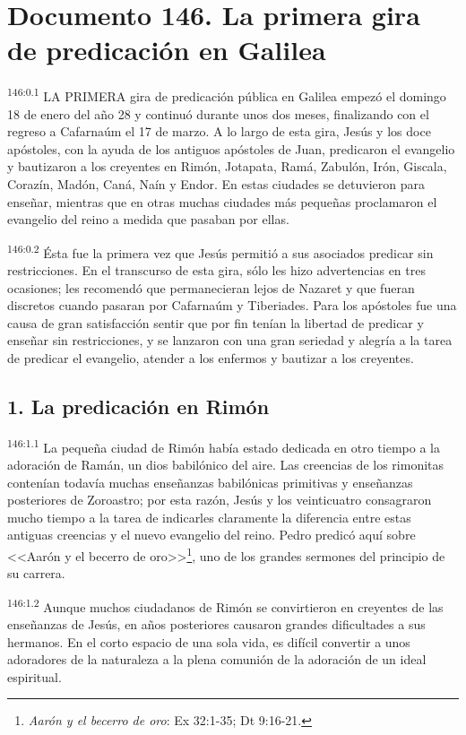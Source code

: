 \chapter{Documento 146. La primera gira de predicación en Galilea}
\par 
\textsuperscript{146:0.1} LA PRIMERA gira de predicación pública en Galilea empezó el domingo 18 de enero del año 28 y continuó durante unos dos meses, finalizando con el regreso a Cafarnaúm el 17 de marzo. A lo largo de esta gira, Jesús y los doce apóstoles, con la ayuda de los antiguos apóstoles de Juan, predicaron el evangelio y bautizaron a los creyentes en Rimón, Jotapata, Ramá, Zabulón, Irón, Giscala, Corazín, Madón, Caná, Naín y Endor. En estas ciudades se detuvieron para enseñar, mientras que en otras muchas ciudades más pequeñas proclamaron el evangelio del reino a medida que pasaban por ellas.

\par 
\textsuperscript{146:0.2} Ésta fue la primera vez que Jesús permitió a sus asociados predicar sin restricciones. En el transcurso de esta gira, sólo les hizo advertencias en tres ocasiones; les recomendó que permanecieran lejos de Nazaret y que fueran discretos cuando pasaran por Cafarnaúm y Tiberiades. Para los apóstoles fue una causa de gran satisfacción sentir que por fin tenían la libertad de predicar y enseñar sin restricciones, y se lanzaron con una gran seriedad y alegría a la tarea de predicar el evangelio, atender a los enfermos y bautizar a los creyentes.

\section*{1. La predicación en Rimón}
\par 
\textsuperscript{146:1.1} La pequeña ciudad de Rimón había estado dedicada en otro tiempo a la adoración de Ramán, un dios babilónico del aire. Las creencias de los rimonitas contenían todavía muchas enseñanzas babilónicas primitivas y enseñanzas posteriores de Zoroastro; por esta razón, Jesús y los veinticuatro consagraron mucho tiempo a la tarea de indicarles claramente la diferencia entre estas antiguas creencias y el nuevo evangelio del reino. Pedro predicó aquí sobre <<Aarón y el becerro de oro>>\footnote{\textit{Aarón y el becerro de oro}: Ex 32:1-35; Dt 9:16-21.}, uno de los grandes sermones del principio de su carrera.

\par 
\textsuperscript{146:1.2} Aunque muchos ciudadanos de Rimón se convirtieron en creyentes de las enseñanzas de Jesús, en años posteriores causaron grandes dificultades a sus hermanos. En el corto espacio de una sola vida, es difícil convertir a unos adoradores de la naturaleza a la plena comunión de la adoración de un ideal espiritual.

